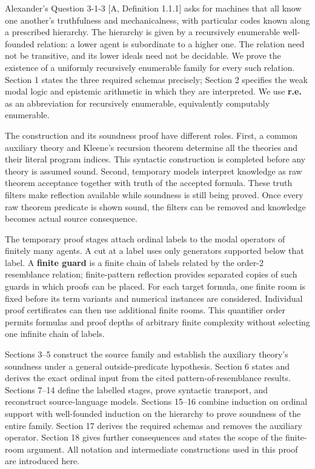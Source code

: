 \documentclass[
  11pt,
  letterpaper,
]{article}
\begin{document}
Alexander's Question 3-1-3 {[}A, Definition 1.1.1{]} asks for machines
that all know one another's truthfulness and mechanicalness, with
particular codes known along a prescribed hierarchy. The hierarchy is
given by a recursively enumerable well-founded relation: a lower agent
is subordinate to a higher one. The relation need not be transitive, and
its lower ideals need not be decidable. We prove the existence of a
uniformly recursively enumerable family for every such relation. Section
1 states the three required schemas precisely; Section 2 specifies the
weak modal logic and epistemic arithmetic in which they are interpreted.
We use \textbf{r.e.} as an abbreviation for recursively enumerable,
equivalently computably enumerable.

The construction and its soundness proof have different roles. First, a
common auxiliary theory and Kleene's recursion theorem determine all the
theories and their literal program indices. This syntactic construction
is completed before any theory is assumed sound. Second, temporary
models interpret knowledge as raw theorem acceptance together with truth
of the accepted formula. These truth filters make reflection available
while soundness is still being proved. Once every raw theorem predicate
is shown sound, the filters can be removed and knowledge becomes actual
source consequence.

The temporary proof stages attach ordinal labels to the modal operators
of finitely many agents. A cut at a label uses only generators supported
below that label. A \textbf{finite guard} is a finite chain of labels
related by the order-2 resemblance relation; finite-pattern reflection
provides separated copies of such guards in which proofs can be placed.
For each target formula, one finite room is fixed before its term
variants and numerical instances are considered. Individual proof
certificates can then use additional finite rooms. This quantifier order
permits formulas and proof depths of arbitrary finite complexity without
selecting one infinite chain of labels.

Sections 3--5 construct the source family and establish the auxiliary
theory's soundness under a general outside-predicate hypothesis. Section
6 states and derives the exact ordinal input from the cited
pattern-of-resemblance results. Sections 7--14 define the labelled
stages, prove syntactic transport, and reconstruct source-language
models. Sections 15--16 combine induction on ordinal support with
well-founded induction on the hierarchy to prove soundness of the entire
family. Section 17 derives the required schemas and removes the
auxiliary operator. Section 18 gives further consequences and states the
scope of the finite-room argument. All notation and intermediate
constructions used in this proof are introduced here.
\end{document}
